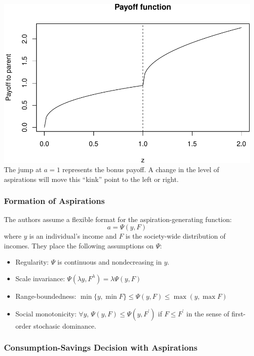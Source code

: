 \documentclass[]{article}
\providecommand{\tightlist}{%
  \setlength{\itemsep}{0pt}\setlength{\parskip}{0pt}}
\begin{document}
\includegraphics{genicot_ray_notes_files/figure-latex/unnamed-chunk-1-1.pdf}
The jump at \(a = 1\) represents the bonus payoff. A change in the level
of aspirations will move this ``kink'' point to the left or right.

\subsubsection{Formation of Aspirations}\label{formation-of-aspirations}

The authors assume a flexible format for the aspiration-generating
function: \[a = \Psi(y,F)\] where \(y\) is an individual's income and
\(F\) is the society-wide distribution of incomes. They place the
following assumptions on \(\Psi\):

\begin{itemize}
\tightlist
\item
  Regularity: \(\Psi\) is continuous and nondecreasing in \(y\).
\item
  Scale invariance: \(\Psi(\lambda y, F^\lambda) = \lambda\Psi(y, F)\)
\item
  Range-boundedness:
  \(\min\{y, \min F\} \leq \Psi(y, F) \leq \max(y, \max F)\)
\item
  Social monotonicity: \(\forall y\),
  \(\Psi(y,F) \leq \Psi(y, F^\prime)\) if \(F \leq F^\prime\) in the
  sense of first-order stochasic dominance.
\end{itemize}

\subsubsection{Consumption-Savings Decision with
Aspirations}\label{consumption-savings-decision-with-aspirations}
\end{document}
